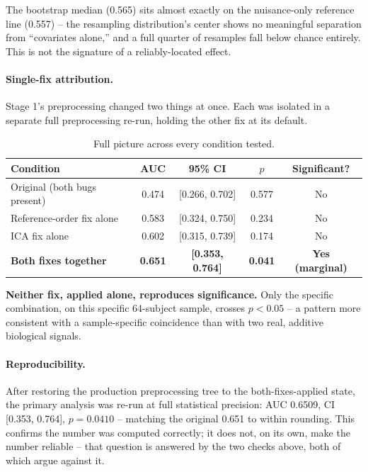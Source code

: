 \documentclass[11pt]{article}
\begin{document}
The bootstrap median (0.565) sits almost exactly on the nuisance-only
reference line (0.557) -- the resampling distribution's center shows no
meaningful separation from ``covariates alone,'' and a full quarter of
resamples fall below chance entirely. This is not the signature of a
reliably-located effect.

\paragraph{Single-fix attribution.} Stage 1's preprocessing changed two
things at once. Each was isolated in a separate full preprocessing
re-run, holding the other fix at its default.

\begin{table}[h]
\centering
\caption{Full picture across every condition tested.}
\begin{tabular}{lcccc}
\toprule
Condition & AUC & 95\% CI & $p$ & Significant? \\
\midrule
Original (both bugs present) & 0.474 & [0.266, 0.702] & 0.577 & No \\
Reference-order fix alone & 0.583 & [0.324, 0.750] & 0.234 & No \\
ICA fix alone & 0.602 & [0.315, 0.739] & 0.174 & No \\
\textbf{Both fixes together} & \textbf{0.651} & \textbf{[0.353, 0.764]} & \textbf{0.041} & \textbf{Yes (marginal)} \\
\bottomrule
\end{tabular}
\end{table}

\textbf{Neither fix, applied alone, reproduces significance.} Only the
specific combination, on this specific 64-subject sample, crosses
$p<0.05$ -- a pattern more consistent with a sample-specific coincidence
than with two real, additive biological signals.

\paragraph{Reproducibility.} After restoring the production preprocessing
tree to the both-fixes-applied state, the primary analysis was re-run at
full statistical precision: AUC 0.6509, CI [0.353, 0.764], $p=0.0410$ --
matching the original 0.651 to within rounding. This confirms the number
was computed correctly; it does not, on its own, make the number
reliable -- that question is answered by the two checks above, both of
which argue against it.
\end{document}

